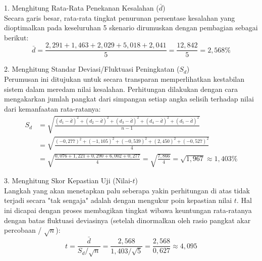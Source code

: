 1. Menghitung Rata-Rata Penekanan Kesalahan ($\bar{d}$) \\
Secara garis besar, rata-rata tingkat penurunan persentase kesalahan yang dioptimalkan pada keseluruhan 5 skenario dirumuskan dengan pembagian sebagai berikut:
\vspace{1cm}
\begin{equation}
\label{eq:ttest_mean}
    \bar{d} = \frac{2,291 + 1,463 + 2,029 + 5,018 + 2,041}{5} = \frac{12,842}{5} = 2,568\%
\end{equation}

\vspace{1cm}
2. Menghitung Standar Deviasi/Fluktuasi Peningkatan ($S_d$) \\
Perumusan ini ditujukan untuk secara transparan memperlihatkan kestabilan sistem dalam meredam nilai kesalahan. Perhitungan dilakukan dengan cara mengakarkan jumlah pangkat dari simpangan setiap angka selisih terhadap nilai dari kemanfaatan rata-ratanya:
\vspace{1cm}
\begin{equation}
\label{eq:ttest_std}
\begin{aligned}
    S_d &= \sqrt{\frac{(d_1 - \bar{d})^2 + (d_2 - \bar{d})^2 + (d_3 - \bar{d})^2 + (d_4 - \bar{d})^2 + (d_5 - \bar{d})^2}{n - 1}} \\[1ex]
        &= \sqrt{\frac{(-0,277)^2 + (-1,105)^2 + (-0,539)^2 + (2,450)^2 + (-0,527)^2}{4}} \\[1ex]
        &= \sqrt{\frac{0,076 + 1,221 + 0,290 + 6,002 + 0,277}{4}} = \sqrt{\frac{7,866}{4}} = \sqrt{1,967} \approx 1,403\%
\end{aligned}
\end{equation}

\vspace{1cm}
3. Menghitung Skor Kepastian Uji (Nilai-$t$) \\
Langkah yang akan menetapkan palu seberapa yakin perhitungan di atas tidak terjadi secara "tak sengaja" adalah dengan mengukur poin kepastian nilai $t$. Hal ini dicapai dengan proses membagikan tingkat wibawa keuntungan rata-ratanya dengan batas fluktuasi deviasinya (setelah dinormalkan oleh rasio pangkat akar percobaan / $\sqrt{n}$):
\vspace{1cm}
\begin{equation}
\label{eq:ttest_t_value}
    t = \frac{\bar{d}}{S_d / \sqrt{n}} = \frac{2,568}{1,403 / \sqrt{5}} = \frac{2,568}{0,627} \approx 4,095
\end{equation}

